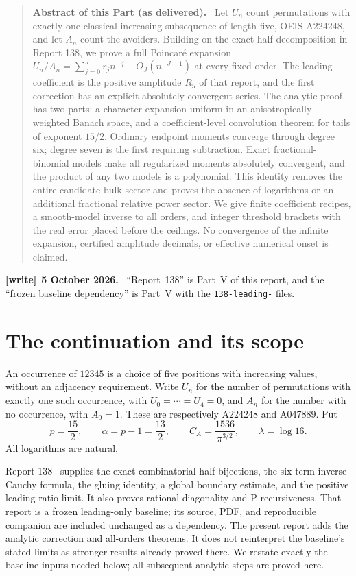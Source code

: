 \documentclass[11pt,letterpaper]{article}
\theoremstyle{remark}\newtheorem{remark}[theorem]{Remark}
\numberwithin{equation}{section}
\newcommand{\file}[1]{\nolinkurl{#1}}
\newenvironment{writenote}[1][]{\par\smallskip\begingroup\small
 \noindent\textbf{[write]}\if\relax\detokenize{#1}\relax\else~\textbf{#1.}\fi\ }%
 {\par\endgroup\smallskip}
\newenvironment{partabstract}{\begin{quote}\small\noindent\textbf{Abstract of this Part (as delivered).}\ }{\end{quote}}
\begin{document}
\begin{partabstract}
Let $U_n$ count permutations with exactly one classical increasing
subsequence of length five, OEIS A224248, and let $A_n$ count the
avoiders. Building on the exact half decomposition in Report 138,
we prove a full Poincar\'e expansion
$U_n/A_n=\sum_{j=0}^J r_jn^{-j}+O_J(n^{-J-1})$ at every fixed order.
The leading coefficient is the positive amplitude $R_5$ of that report,
and the first correction has an explicit absolutely convergent series.
The analytic proof has two parts: a character expansion uniform in an
anisotropically weighted Banach space, and a coefficient-level
convolution theorem for tails of exponent $15/2$. Ordinary endpoint
moments converge through degree six; degree seven is the first requiring
subtraction. Exact fractional-binomial models make all regularized
moments absolutely convergent, and the product of any two models is a
polynomial. This identity removes the entire candidate bulk sector and
proves the absence of logarithms or an additional fractional relative
power sector. We give finite coefficient recipes, a smooth-model inverse
to all orders, and integer threshold brackets with the real error placed
before the ceilings. No convergence of the infinite expansion, certified
amplitude decimals, or effective numerical onset is claimed.
\end{partabstract}
\begin{writenote}[5 October 2026]
``Report~138'' \cite{R138} is Part~V of this report, and the ``frozen baseline dependency'' is Part~V with the \file{138-leading-} files.
\end{writenote}


\section{The continuation and its scope}\label{upo:all5:sec:intro}
An occurrence of $12345$ is a choice of five positions with increasing
values, without an adjacency requirement. Write $U_n$ for the number of
permutations with exactly one such occurrence, with $U_0=\cdots=U_4=0$,
and $A_n$ for the number with no occurrence, with $A_0=1$.
These are respectively A224248 and A047889. Put
\begin{equation}\label{upo:all5:eq:constants}
 p=\frac{15}{2},\qquad \alpha=p-1=\frac{13}{2},\qquad
 C_A=\frac{1536}{\pi^{3/2}},\qquad \lambda=\log16.
\end{equation}
All logarithms are natural.

Report 138~\cite{R138} supplies the exact combinatorial half
bijections, the six-term inverse-Cauchy formula, the gluing identity,
a global boundary estimate, and the positive leading ratio limit.
It also proves rational diagonality and P-recursiveness. That report is
a frozen leading-only baseline; its source, PDF, and reproducible
companion are included unchanged as a dependency. The present report
adds the analytic correction and all-orders theorems. It does not
reinterpret the baseline's stated limits as stronger results already
proved there. We restate exactly the baseline inputs needed below;
all subsequent analytic steps are proved here.
\end{document}
